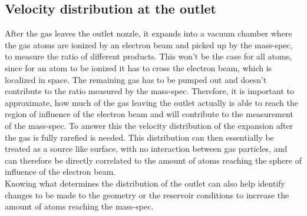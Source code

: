 \subsection{Velocity distribution at the outlet}

	After the gas leaves the outlet nozzle, it expands into a vacuum chamber where the gas atoms are ionized by an electron beam and picked up by the mass-spec, to measure the ratio of different products.
	This won't be the case for all atoms, since for an atom to be ionized it has to cross the electron beam, which is localized in space.
	The remaining gas has to be pumped out and doesn't contribute to the ratio measured by the mass-spec.
	Therefore, it is important to approximate, how much of the gas leaving the outlet actually is able to reach the region of influence of the electron beam and will contribute to the measurement of the mass-spec.
	To answer this the velocity distribution of the expansion after the gas is fully rarefied is needed.
	This distribution can then essentially be treated as a source like surface, with no interaction between gas particles, and can therefore be directly correlated to the amount of atoms reaching the sphere of influence of the electron beam.\\
	Knowing what determines the distribution of the outlet can also help identify changes to be made to the geometry or the reservoir conditions to increase the amount of atoms reaching the mass-spec.
